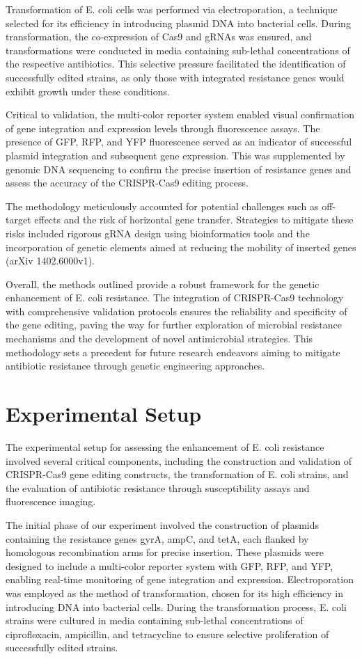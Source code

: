 \documentclass{article}
\begin{document}
Transformation of E. coli cells was performed via electroporation, a technique selected for its efficiency in introducing plasmid DNA into bacterial cells. During transformation, the co-expression of Cas9 and gRNAs was ensured, and transformations were conducted in media containing sub-lethal concentrations of the respective antibiotics. This selective pressure facilitated the identification of successfully edited strains, as only those with integrated resistance genes would exhibit growth under these conditions.

Critical to validation, the multi-color reporter system enabled visual confirmation of gene integration and expression levels through fluorescence assays. The presence of GFP, RFP, and YFP fluorescence served as an indicator of successful plasmid integration and subsequent gene expression. This was supplemented by genomic DNA sequencing to confirm the precise insertion of resistance genes and assess the accuracy of the CRISPR-Cas9 editing process.

The methodology meticulously accounted for potential challenges such as off-target effects and the risk of horizontal gene transfer. Strategies to mitigate these risks included rigorous gRNA design using bioinformatics tools and the incorporation of genetic elements aimed at reducing the mobility of inserted genes (arXiv 1402.6000v1).

Overall, the methods outlined provide a robust framework for the genetic enhancement of E. coli resistance. The integration of CRISPR-Cas9 technology with comprehensive validation protocols ensures the reliability and specificity of the gene editing, paving the way for further exploration of microbial resistance mechanisms and the development of novel antimicrobial strategies. This methodology sets a precedent for future research endeavors aiming to mitigate antibiotic resistance through genetic engineering approaches.

\section{Experimental Setup}
The experimental setup for assessing the enhancement of E. coli resistance involved several critical components, including the construction and validation of CRISPR-Cas9 gene editing constructs, the transformation of E. coli strains, and the evaluation of antibiotic resistance through susceptibility assays and fluorescence imaging. 

The initial phase of our experiment involved the construction of plasmids containing the resistance genes gyrA, ampC, and tetA, each flanked by homologous recombination arms for precise insertion. These plasmids were designed to include a multi-color reporter system with GFP, RFP, and YFP, enabling real-time monitoring of gene integration and expression. Electroporation was employed as the method of transformation, chosen for its high efficiency in introducing DNA into bacterial cells. During the transformation process, E. coli strains were cultured in media containing sub-lethal concentrations of ciprofloxacin, ampicillin, and tetracycline to ensure selective proliferation of successfully edited strains.
\end{document}
